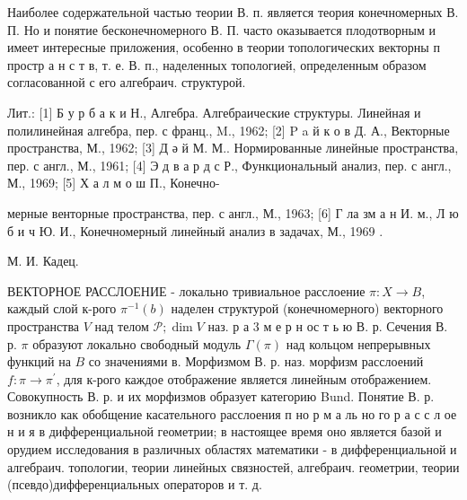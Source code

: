 \documentclass[10pt]{article}
\begin{document}
Наиболее содержательной частью теории В. п. является теория конечномерных В. П. Но и понятие бесконечномерного В. П. часто оказывается плодотворным и имеет интересные приложения, особенно в теории топологических векторны п простр а н с т в, т. е. В. п., наделенных топологией, определенным образом согласованной с его алгебраич. структурой.



Лит.: [1] Б у р б а к и Н., Алгебра. Алгебраические структуры. Линейная и полилинейная алгебра, пер. с франц., M., 1962; [2] P a й к о в Д. А., Векторные пространства, М., 1962; [3] Д ә й М. М.. Нормированные линейные пространства, пер. с англ., М., 1961; [4] Э д в а р д с Р., Функциональный анализ, пер. с англ., М., 1969; [5] Х а л м о ш П., Конечно-

мерные венторные пространства, пер. с англ., М., 1963; [6] Г ла зм а н И. м., Л ю б и ч Ю. И., Конечномерный линейный анализ в задачах, М., 1969 .



М. И. Кадец.



ВЕКТОРНОЕ РАССЛОЕНИЕ - локально тривиальное расслоение $\pi: X \rightarrow B$, каждый слой к-рого $\pi^{-1}(b)$ наделен структурой (конечномерного) векторного пространства $V$ над телом $\mathscr{P} ; \operatorname{dim} V$ наз. р а 3 м е р н ос т ь ю В. р. Сечения В. р. $\pi$ образуют локально свободный модуль $\Gamma(\pi)$ над кольцом непрерывных функций на $B$ со значениями в. Морфизмом В. р. наз. морфизм расслоений $f: \pi \rightarrow \pi^{\prime}$, для к-рого каждое отображение является линейным отображением. Совокупность В. р. и их морфизмов образует категорию Bund. Понятие В. р. возникло как обобщение касательного расслоения п но р м а ль но го р а с с л ое н и я в дифференциальной геометрии; в настоящее время оно является базой и орудием исследования в различных областях математики - в дифференциальной и алгебраич. топологии, теории линейных связностей, алгебраич. геометрии, теории (псевдо)дифференциальных операторов и т. д.
\end{document}
